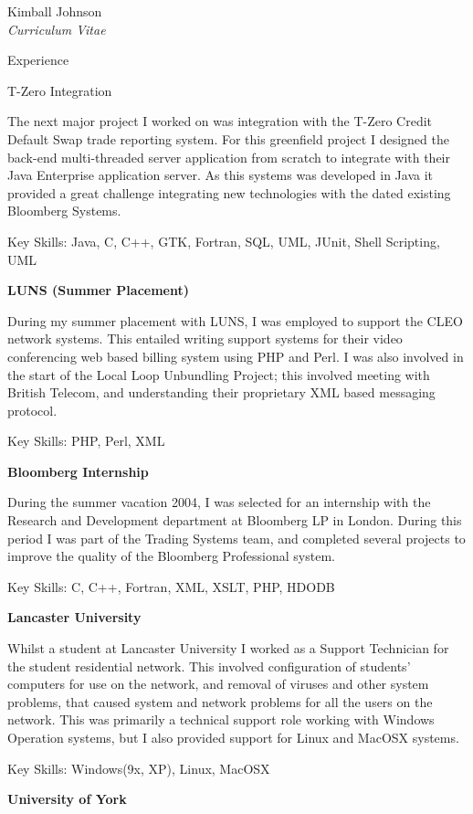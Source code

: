 \documentclass[10pt]{article}
\newenvironment{subbulletlist}{%
	\begin{list}{\labelitemii}{%
		\setlength{\topsep}{\itemsep}\setlength{\parskip}{\parsep}%
	}%
}%
{ \end{list} }
\begin{document}
\begin{cv}{Kimball Johnson\\{\large \itshape Curriculum Vitae}}
\begin{cvlist}{Experience}
\begin{subbulletlist}
    \item T-Zero Integration

    The next major project I worked on was integration with the T-Zero
    Credit Default Swap trade reporting system. For this greenfield project 
	I designed the back-end multi-threaded server application from scratch to integrate 
	with their Java Enterprise application server.  As this systems was developed
	in Java it provided a great challenge integrating new technologies with the dated 
    existing Bloomberg Systems.  
	\end{subbulletlist}

	Key Skills: Java, C, C++, GTK, Fortran, SQL, UML, JUnit, Shell Scripting, UML 
	\item \textbf{LUNS (Summer Placement)}

    During my summer placement with LUNS, I was employed to support
    the CLEO network systems. This entailed writing support systems for 
    their video conferencing web based billing system using PHP and Perl. 
    I was also involved in the start of the Local Loop Unbundling Project; 
    this involved meeting with British Telecom, and
    understanding their proprietary XML based messaging protocol.

	Key Skills: PHP, Perl, XML
    \item \textbf{Bloomberg Internship}

    During the summer vacation 2004, I was selected for an internship with the 
    Research and Development department at Bloomberg LP in London. During this 
    period I was part of the Trading Systems team, and completed several projects
    to improve the quality of the Bloomberg Professional system.

	Key Skills: C, C++, Fortran, XML, XSLT, PHP, HDODB
    \item \textbf{Lancaster University}

    Whilst a student at Lancaster University I worked as a Support Technician for
    the student residential network. This involved configuration of students' 
    computers for use on the network, and removal of viruses and other system
    problems, that caused system and network problems for all the users on the network.  
    This was primarily a technical support role working with Windows Operation 
    systems, but I also provided support for Linux and MacOSX systems.

	Key Skills: Windows(9x, XP), Linux, MacOSX
    \item \textbf{University of York}


\end{cvlist}
\end{cv}
\end{document}
